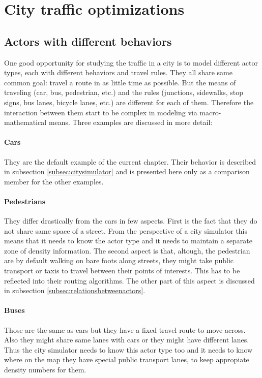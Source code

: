 \documentclass[a4paper,12pt,twoside]{book}
\begin{document}
\section{City traffic optimizations}
\label{sec:citytrafficoptimizations}

\subsection{Actors with different behaviors}
\label{subsec:actordiffbehaviors}

One good opportunity for studying the traffic in a city is to model different actor types, each with different behaviors and travel rules. They all share same common goal: travel a route in as little time as possible. But the means of traveling (car, bus, pedestrian, etc.) and the rules (junctions, sidewalks, stop signs, bus lanes, bicycle lanes, etc.) are different for each of them. Therefore the interaction between them start to be complex in modeling via macro-mathematical means. Three examples are discussed in more detail:

\paragraph{Cars} They are the default example of the current chapter. Their behavior is described in subsection \ref{subsec:citysimulator} and is presented here only as a comparison member for the other examples.
\paragraph{Pedestrians} \label{par:pedestrians} They differ drastically from the cars in few aspects. First is the fact that they do not share same space of a street. From the perspective of a city simulator this means that it needs to know the actor type and it needs to maintain a separate zone of density information. The second aspect is that, altough, the pedestrian are by default walking on bare foots along streets, they might take public transport or taxis to travel between their points of interests. This has to be reflected into their routing algorithms. The other part of this aspect is discussed in subsection \ref{subsec:relationsbetweenactors}.
\paragraph{Buses} Those are the same as cars but they have a fixed travel route to move across. Also they might share same lanes with cars or they might have different lanes. Thus the city simulator needs to know this actor type too and it needs to know where on the map they have special public transport lanes, to keep appropiate density numbers for them.
\end{document}
